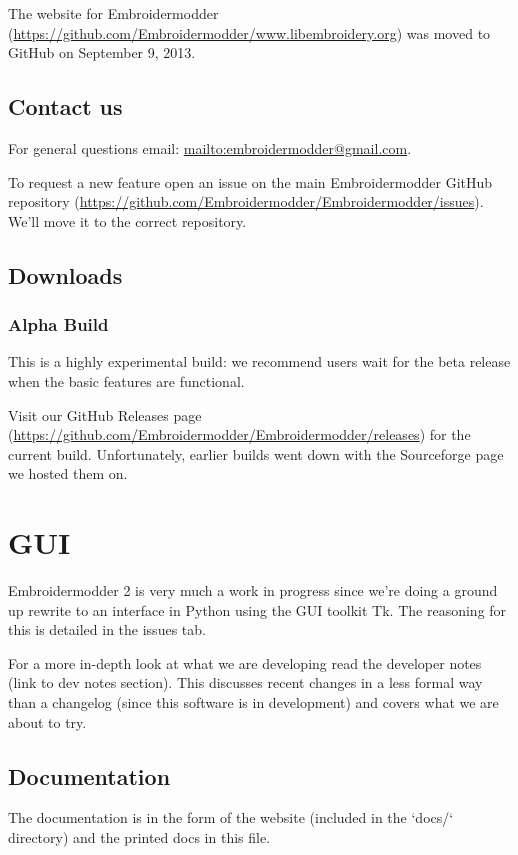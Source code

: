 \documentclass[a4paper]{report}
\begin{document}
The website for Embroidermodder
(\url{https://github.com/Embroidermodder/www.libembroidery.org}) was moved to
GitHub on September 9, 2013.

\section{Contact us}

For general questions email: \url{mailto:embroidermodder@gmail.com}.

To request a new feature  open an issue on the main Embroidermodder GitHub
repository (\url{https://github.com/Embroidermodder/Embroidermodder/issues}).
We'll move it to the correct repository.

\section{Downloads}

\subsection{Alpha Build}

This is a highly experimental build: we recommend users wait for the beta
release when the basic features are functional.

Visit our  GitHub Releases page
(\url{https://github.com/Embroidermodder/Embroidermodder/releases})
for the current build. Unfortunately, earlier builds went down with the
Sourceforge page we hosted them on.

\chapter{GUI}

Embroidermodder 2 is very much a work in progress since we're doing a ground
up rewrite to an interface in Python using the GUI toolkit Tk. The reasoning for
this is detailed in the issues tab.

For a more in-depth look at what we are developing read the developer notes (link to dev notes
section). This discusses recent changes in a less formal way than a changelog (since this
software is in development) and covers what we are about to try.

\section{Documentation}

The documentation is in the form of the website (included in the `docs/` directory) and the
printed docs in this file.
\end{document}
